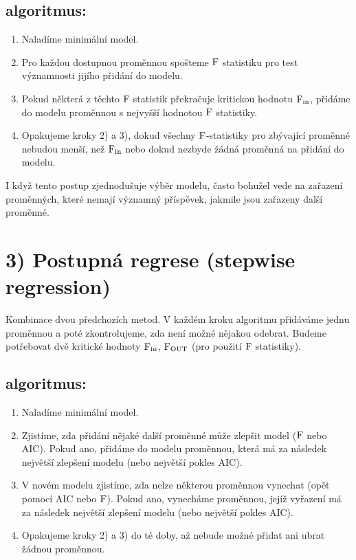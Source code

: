 \subsection*{algoritmus:}\begin{enumerate}[	1)]
	\item Naladíme minimální model.
	\item Pro každou dostupnou proměnnou spošteme $\mathrm{F}$ statistiku pro test významnosti jijího přidání do modelu.
	\item Pokud některá z těchto $\mathrm{F}$ statistik překračuje kritickou hodnotu $\mathrm{F}_\mathrm{in}$, přidáme do modelu proměnnou s nejvyšší hodnotou $\mathrm{F}$ statistiky.
	\item Opakujeme kroky 2) a 3), dokud všechny $\mathrm{F}$-statistiky pro zbývající proměnné nebudou menší, než $\mathrm{F}_\mathrm{in}$ nebo dokud nezbyde žádná proměnná na přidání do modelu.
\end{enumerate}
\begin{remark}
	I když tento postup zjednodušuje výběr modelu, často bohužel vede na zařazení proměnných, které nemají významný příspěvek, jakmile jsou zařazeny další proměnné.
\end{remark}

\section*{3) Postupná regrese (stepwise regression)}
Kombinace dvou předchozích metod. V každém kroku algoritmu přidáváme jednu proměnnou a poté zkontrolujeme, zda není možné nějakou odebrat. Budeme potřebovat  dvě kritické hodnoty $\mathrm{F}_\mathrm{in}$, $\mathrm{F}_\mathrm{OUT}$ (pro použití $\mathrm{F}$ statistiky).

\subsection*{algoritmus:}\begin{enumerate}[	1)]
	\item Naladíme minimální model.
	\item Zjistíme, zda přidání nějaké další proměnné může zlepšit model ($\mathrm{F}$ nebo AIC). Pokud ano, přidáme do modelu proměnnou, která má za následek největší zlepšení modelu (nebo největší pokles AIC).
	\item V novém modelu zjistíme, zda nelze některou proměnnou vynechat (opět pomocí AIC nebo $\mathrm{F}$). Pokud ano, vynecháme proměnnou, jejíž vyřazení má za následek největší zlepšení modelu (nebo největší pokles AIC).
	\item Opakujeme kroky 2) a 3) do té doby, až nebude možné přidat ani ubrat žádnou proměnnou.
\end{enumerate}


